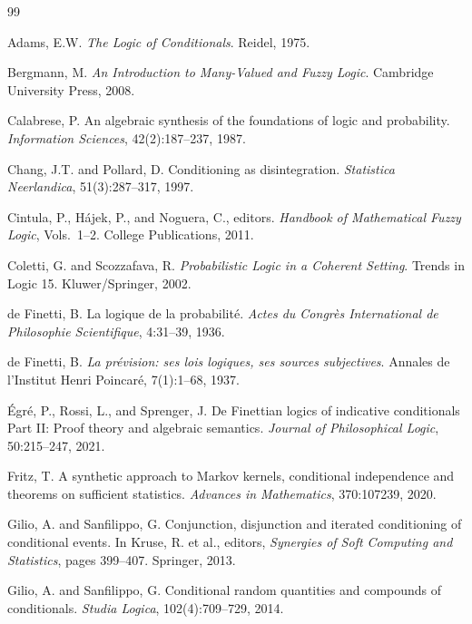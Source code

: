\documentclass[11pt,a4paper]{article}
\begin{document}
\begin{thebibliography}{99}

Adams, E.W.
\newblock \emph{The Logic of Conditionals}.
\newblock Reidel, 1975.

Bergmann, M.
\newblock \emph{An Introduction to Many-Valued and Fuzzy Logic}.
\newblock Cambridge University Press, 2008.

Calabrese, P.
\newblock An algebraic synthesis of the foundations of logic and probability.
\newblock \emph{Information Sciences}, 42(2):187--237, 1987.

Chang, J.T. and Pollard, D.
\newblock Conditioning as disintegration.
\newblock \emph{Statistica Neerlandica}, 51(3):287--317, 1997.

Cintula, P., H\'ajek, P., and Noguera, C., editors.
\newblock \emph{Handbook of Mathematical Fuzzy Logic}, Vols.~1--2.
\newblock College Publications, 2011.

Coletti, G. and Scozzafava, R.
\newblock \emph{Probabilistic Logic in a Coherent Setting}.
\newblock Trends in Logic 15. Kluwer/Springer, 2002.

de Finetti, B.
\newblock La logique de la probabilit\'e.
\newblock \emph{Actes du Congr\`es International de Philosophie Scientifique},
4:31--39, 1936.

de Finetti, B.
\newblock \emph{La pr\'evision: ses lois logiques, ses sources subjectives}.
\newblock Annales de l'Institut Henri Poincar\'e, 7(1):1--68, 1937.

\'Egr\'e, P., Rossi, L., and Sprenger, J.
\newblock De Finettian logics of indicative conditionals {Part II}: Proof theory and algebraic semantics.
\newblock \emph{Journal of Philosophical Logic}, 50:215--247, 2021.

Fritz, T.
\newblock A synthetic approach to {Markov} kernels, conditional independence and theorems on sufficient statistics.
\newblock \emph{Advances in Mathematics}, 370:107239, 2020.

Gilio, A. and Sanfilippo, G.
\newblock Conjunction, disjunction and iterated conditioning of conditional events.
\newblock In Kruse, R. et al., editors, \emph{Synergies of Soft Computing and Statistics},
pages 399--407. Springer, 2013.

Gilio, A. and Sanfilippo, G.
\newblock Conditional random quantities and compounds of conditionals.
\newblock \emph{Studia Logica}, 102(4):709--729, 2014.


\end{thebibliography}
\end{document}
